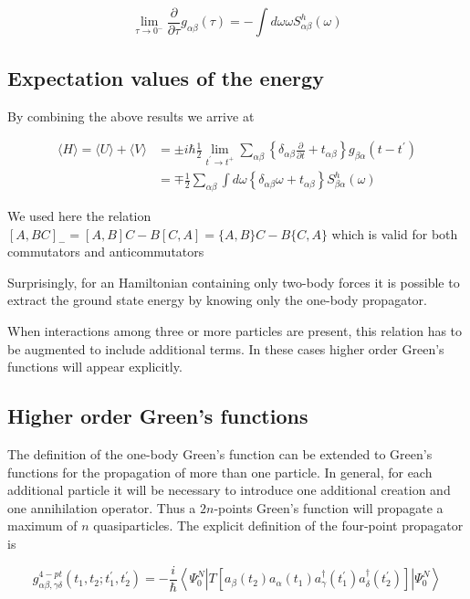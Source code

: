{$$
\lim _{\tau \rightarrow 0^{-}} \frac{\partial}{\partial \tau} g_{\alpha \beta}(\tau)=-\int d \omega \omega S_{\alpha \beta}^{h}(\omega)
$$


\subsection{Expectation values of the energy}

By combining the above results we arrive at

$$
\begin{aligned}
\langle H\rangle=\langle U\rangle+\langle V\rangle & = \pm i \hbar \frac{1}{2} \lim _{t^{\prime} \rightarrow t^{+}} \sum_{\alpha \beta}\left\{\delta_{\alpha \beta} \frac{\partial}{\partial t}+t_{\alpha \beta}\right\} g_{\beta \alpha}\left(t-t^{\prime}\right) \\
& =\mp \frac{1}{2} \sum_{\alpha \beta} \int d \omega\left\{\delta_{\alpha \beta} \omega+t_{\alpha \beta}\right\} S_{\beta \alpha}^{h}(\omega)
\end{aligned}
$$

We used here the relation $[A, B C]_{-}=[A, B] C-B[C, A]=\{A, B\}
C-B\{C, A\}$ which is valid for both commutators and anticommutators


Surprisingly, for an Hamiltonian containing only two-body forces it is
possible to extract the ground state energy by knowing only the
one-body propagator. 

When interactions among three or more particles are present, this
relation has to be augmented to include additional terms. In these
cases higher order Green's functions will appear explicitly.


\subsection{Higher order  Green's functions}

The definition of the one-body Green's function  can be extended to Green's functions for the
propagation of more than one particle. In general, for each additional
particle it will be necessary to introduce one additional creation and
one annihilation operator. Thus a $2 n$-points Green's function will
propagate a maximum of $n$ quasiparticles. The explicit definition of
the four-point propagator is

$$
g_{\alpha \beta, \gamma \delta}^{4-p t}\left(t_{1}, t_{2} ; t_{1}^{\prime}, t_{2}^{\prime}\right)=-\frac{i}{\hbar}\left\langle\Psi_{0}^{N}\left|T\left[a_{\beta}\left(t_{2}\right) a_{\alpha}\left(t_{1}\right) a_{\gamma}^{\dagger}\left(t_{1}^{\prime}\right) a_{\delta}^{\dagger}\left(t_{2}^{\prime}\right)\right]\right| \Psi_{0}^{N}\right\rangle
$$

}
